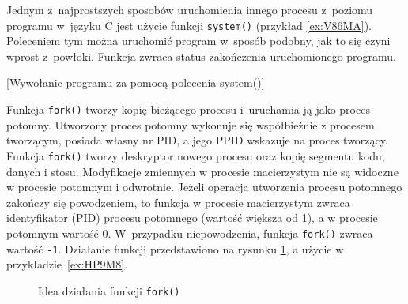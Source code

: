 Jednym z~najprostszych sposobów uruchomienia innego procesu z~poziomu programu
w~języku C jest użycie funkcji \texttt{system()} (przykład \ref{ex:V86MA}).
Poleceniem tym można uruchomić program w~sposób podobny, jak to się czyni
wprost z~powłoki. Funkcja zwraca status zakończenia uruchomionego programu.

\begin{example}{[Wywołanie programu za pomocą polecenia system()]}
  \label{ex:V86MA}
  
\end{example}

Funkcja \texttt{fork()} tworzy kopię bieżącego procesu i~uruchamia ją jako
proces potomny. Utworzony proces potomny wykonuje się współbieżnie z procesem
tworzącym, posiada własny nr PID, a jego PPID wskazuje na proces tworzący.
Funkcja \texttt{fork()} tworzy deskryptor nowego procesu oraz kopię segmentu
kodu, danych i stosu. Modyfikacje zmiennych w procesie macierzystym nie są
widoczne w procesie potomnym i odwrotnie. Jeżeli operacja utworzenia procesu
potomnego zakończy się powodzeniem, to funkcja w procesie macierzystym zwraca
identyfikator (PID) procesu potomnego (wartość większa od 1), a w procesie
potomnym wartość 0. W~przypadku niepowodzenia, funkcja \texttt{fork()} zwraca
wartość \texttt{-1}. Działanie funkcji przedstawiono na rysunku
\ref{fig:S278F}, a użycie w przykładzie~\ref{ex:HP9M8}.

\begin{figure}
  \centering
  \caption{Idea działania funkcji \texttt{fork()}}
  \label{fig:S278F}
\end{figure}

